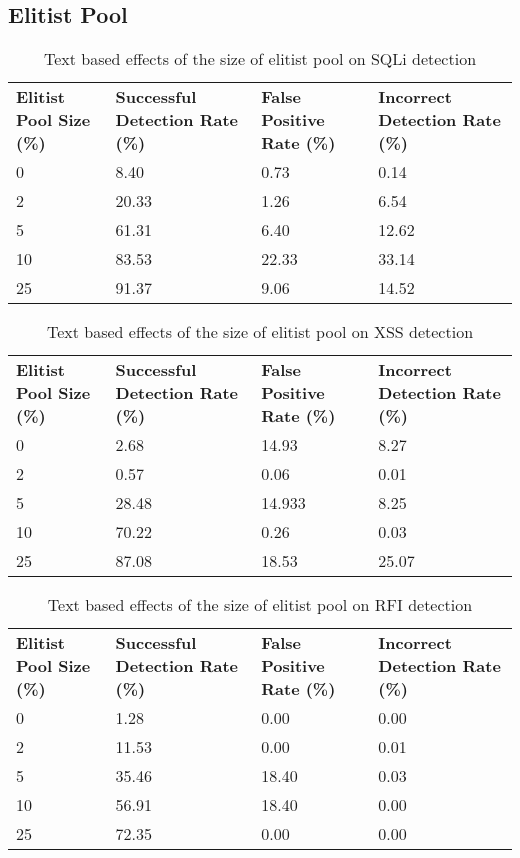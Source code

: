 \begin{appendices}
\newpage
\section{Elitist Pool}

\begin{table}[h]
	\centering
	\begin{tabular}{|p{1.5in}|p{1in}|p{1in}|p{1in}|}
	\hline
	\textbf{Elitist Pool Size (\%)} & \textbf{Successful Detection Rate (\%)} & \textbf{False Positive Rate (\%)} & \textbf{Incorrect Detection Rate (\%)}  \\
	\hhline{|=|=|=|=|}
	0 & 8.40 & 0.73 & 0.14 \\
	\hline
	2 & 20.33 & 1.26 & 6.54 \\
	\hline
	5 & 61.31 & 6.40 & 12.62 \\
	\hline
	10 & 83.53 & 22.33 & 33.14 \\
	\hline
	25 & 91.37 & 9.06 & 14.52 \\
	\hline
	\end{tabular}
	\caption[]{Text based effects of the size of elitist pool on SQLi detection}
	\label{app:sqlElitistText}
\end{table}

\begin{table}[h]
	\centering
	\begin{tabular}{|p{1.5in}|p{1in}|p{1in}|p{1in}|}
	\hline
	\textbf{Elitist Pool Size (\%)} & \textbf{Successful Detection Rate (\%)} & \textbf{False Positive Rate (\%)} & \textbf{Incorrect Detection Rate (\%)}  \\
	\hhline{|=|=|=|=|}
	0 & 2.68 & 14.93 & 8.27 \\
	\hline
	2 & 0.57 & 0.06 & 0.01 \\
	\hline
	5 & 28.48 & 14.933 & 8.25 \\
	\hline
	10 & 70.22 & 0.26 & 0.03 \\
	\hline
	25 & 87.08 & 18.53 & 25.07 \\
	\hline
	\end{tabular}
	\caption[]{Text based effects of the size of elitist pool on XSS detection}
	\label{app:xssElitistText}
\end{table}

\begin{table}[h]
	\centering
	\begin{tabular}{|p{1.5in}|p{1in}|p{1in}|p{1in}|}
	\hline
	\textbf{Elitist Pool Size (\%)} & \textbf{Successful Detection Rate (\%)} & \textbf{False Positive Rate (\%)} & \textbf{Incorrect Detection Rate (\%)}  \\
	\hhline{|=|=|=|=|}
	0 & 1.28 & 0.00 & 0.00 \\
	\hline
	2 & 11.53 & 0.00 & 0.01 \\
	\hline
	5 & 35.46 & 18.40 & 0.03 \\
	\hline
	10 & 56.91 & 18.40 & 0.00 \\
	\hline
	25 & 72.35 & 0.00 & 0.00 \\
	\hline
	\end{tabular}
	\caption[]{Text based effects of the size of elitist pool on RFI detection}
	\label{app:rfiElitistText}
\end{table}


\end{appendices}
